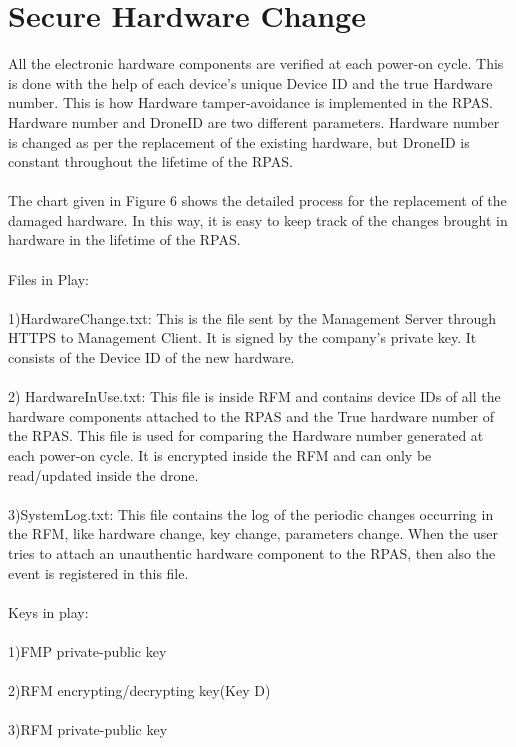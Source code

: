 \documentclass[18pt]{article}
\begin{document}
\section{Secure Hardware Change}
All the electronic hardware components are verified at each power-on cycle. This is done with the help of each device's unique Device ID and the true Hardware number.
This is how Hardware tamper-avoidance is implemented in the RPAS.
Hardware number and DroneID are two different parameters. Hardware number is changed as per the replacement of the existing hardware, but DroneID is constant throughout the lifetime of the RPAS.\\
\\
 The chart given in Figure 6 shows the detailed process for the replacement of the damaged hardware. In this way, it is easy to keep track of the changes brought in hardware in the lifetime of the RPAS.\\
\\Files in Play:\\
\\
1)HardwareChange.txt: This is the file sent by the Management Server through HTTPS to Management Client. It is signed by the company's private key. It consists of the Device ID of the new hardware.\\
\\
2) HardwareInUse.txt: This file is inside RFM and contains device IDs of all the hardware components attached to the RPAS and the True hardware number of the RPAS. This file is used for comparing the Hardware number generated at each power-on cycle. It is encrypted inside the RFM and can only be read/updated inside the drone.\\
\\
3)SystemLog.txt: This file contains the log of the periodic changes occurring in the RFM, like hardware change, key change, parameters change. When the user tries to attach an unauthentic hardware component to the RPAS, then also the event is registered in this file.\\
\\
Keys in play:\\
\\
1)FMP private-public key\\
\\
2)RFM encrypting/decrypting key(Key D)\\
\\3)RFM private-public key\\
\end{document}
